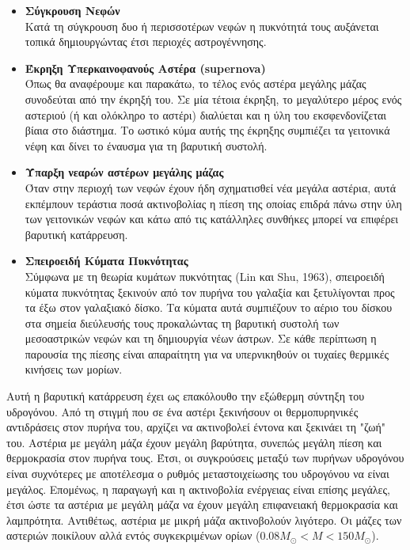  \begin{itemize}
  \item \textbf{Σύγκρουση Νεφών}\\
  Κατά τη σύγκρουση δυο ή περισσοτέρων νεφών η πυκνότητά τους αυξάνεται τοπικά δημιουργώντας έτσι περιοχές αστρογέννησης.
  
  \item \textbf{Έκρηξη Υπερκαινοφανούς Αστέρα (supernova)}\\
Όπως θα αναφέρουμε και παρακάτω, το τέλος ενός αστέρα μεγάλης μάζας συνοδεύται από την έκρηξή του. Σε μία τέτοια έκρηξη, το μεγαλύτερο μέρος ενός αστεριού (ή και ολόκληρο το αστέρι) διαλύεται και η ύλη του εκσφενδονίζεται βίαια στο διάστημα. Το ωστικό κύμα αυτής της έκρηξης συμπιέζει τα γειτονικά νέφη και δίνει το έναυσμα για τη βαρυτική συστολή.

  \item \textbf{Ύπαρξη νεαρών αστέρων μεγάλης μάζας}\\
 Όταν στην περιοχή των νεφών έχουν ήδη σχηματισθεί νέα μεγάλα αστέρια, αυτά εκπέμπουν τεράστια ποσά ακτινοβολίας η πίεση της οποίας επιδρά πάνω στην ύλη των γειτονικών νεφών και κάτω από τις κατάλληλες συνθήκες μπορεί να επιφέρει βαρυτική κατάρρευση.
 
 \item \textbf{Σπειροειδή Κύματα Πυκνότητας}\\
Σύμφωνα με τη θεωρία κυμάτων πυκνότητας (Lin και Shu, 1963), σπειροειδή κύματα πυκνότητας ξεκινούν από τον πυρήνα του γαλαξία και ξετυλίγονται προς τα έξω στον γαλαξιακό δίσκο. Τα κύματα αυτά συμπιέζουν το αέριο του δίσκου στα σημεία διεύλευσής τους προκαλώντας τη βαρυτική συστολή των μεσοαστρικών νεφών και τη δημιουργία νέων άστρων. Σε κάθε περίπτωση η παρουσία της πίεσης είναι απαραίτητη για να υπερνικηθούν οι τυχαίες θερμικές κινήσεις των μορίων.
\end{itemize}

Αυτή η βαρυτική κατάρρευση έχει ως επακόλουθο την εξώθερμη σύντηξη του υδρογόνου. Από τη στιγμή που σε ένα αστέρι ξεκινήσουν οι  θερμοπυρηνικές αντιδράσεις στον πυρήνα του, αρχίζει να ακτινοβολεί έντονα και ξεκινάει τη "ζωή" του. Αστέρια με μεγάλη μάζα έχουν μεγάλη βαρύτητα, συνεπώς μεγάλη πίεση και θερμοκρασία στον πυρήνα τους. Έτσι, οι συγκρούσεις μεταξύ των πυρήνων υδρογόνου είναι συχνότερες με αποτέλεσμα ο ρυθμός μεταστοιχείωσης του υδρογόνου να είναι μεγάλος. Επομένως, η παραγωγή και η ακτινοβολία ενέργειας είναι επίσης μεγάλες, έτσι ώστε τα αστέρια με μεγάλη μάζα να έχουν μεγάλη επιφανειακή θερμοκρασία και λαμπρότητα. Αντιθέτως, αστέρια με μικρή μάζα ακτινοβολούν λιγότερο. Οι μάζες των αστεριών ποικίλουν αλλά εντός συγκεκριμένων ορίων ($0.08 M_{\odot}<M<150 M_{\odot}$).
